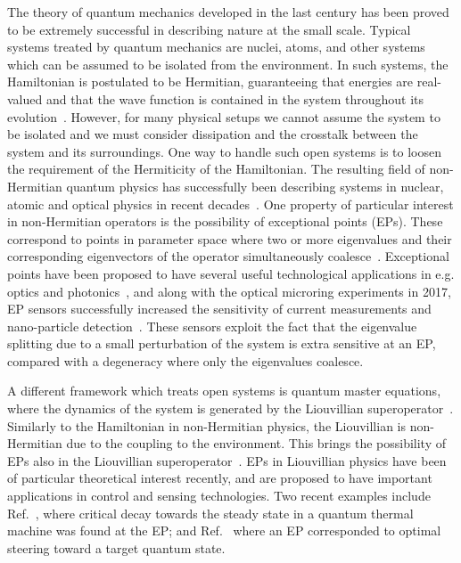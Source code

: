 \documentclass[../main.tex]{subfiles}
\begin{document}
The theory of quantum mechanics developed in the last century has been proved to be extremely successful in describing nature at the small scale. Typical systems treated by quantum mechanics are nuclei, atoms, and other systems which can be assumed to be isolated from the environment. In such systems, the Hamiltonian is postulated to be Hermitian, guaranteeing that energies are real-valued and that the wave function is contained in the system throughout its evolution~\cite{sakurai}. However, for many physical setups we cannot assume the system to be isolated and we must consider dissipation and the crosstalk between the system and its surroundings. One way to handle such open systems is to loosen the requirement of the Hermiticity of the Hamiltonian. The resulting field of non-Hermitian quantum physics has successfully been describing systems in nuclear, atomic and optical physics in recent decades~\cite{nonHermrev}. One property of particular interest in non-Hermitian operators is the possibility of exceptional points (EPs). These correspond to points in parameter space where two or more eigenvalues and their corresponding eigenvectors of the operator simultaneously coalesce~\cite{ep_expl}. Exceptional points have been proposed to have several useful technological applications in e.g. optics and photonics~\cite{eptechrev1,eptechrev2}, and along with the optical microring experiments in 2017, EP sensors successfully increased the sensitivity of current measurements and nano-particle detection~\cite{microring1, microring2}. These sensors exploit the fact that the eigenvalue splitting due to a small perturbation of the system is extra sensitive at an EP, compared with a degeneracy where only the eigenvalues coalesce.

A different framework which treats open systems is quantum master equations, where the dynamics of the system is generated by the Liouvillian superoperator~\cite{bookopen}. Similarly to the Hamiltonian in non-Hermitian physics, the Liouvillian is non-Hermitian due to the coupling to the environment. This brings the possibility of EPs also in the Liouvillian superoperator~\cite{HEPvsLEP}. EPs in Liouvillian physics have been of particular theoretical interest recently, and are proposed to have important applications in control and sensing technologies. Two recent examples include Ref.~\cite{thermal}, where critical decay towards the steady state in a quantum thermal machine was found at the EP; and Ref.~\cite{steering} where an EP corresponded to optimal steering toward a target quantum state.
\end{document}
